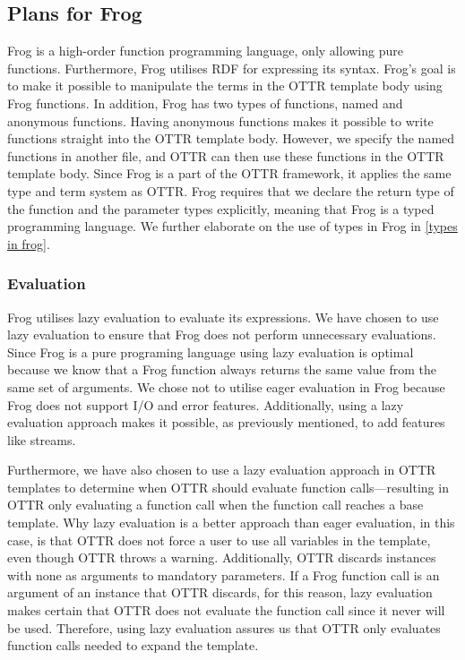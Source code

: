 \subsection{Plans for Frog}
Frog is a high-order function programming language, only allowing pure functions. Furthermore, Frog utilises RDF for expressing its syntax. Frog's goal is to make it possible to manipulate the terms in the OTTR template body using Frog functions. In addition, Frog has two types of functions, named and anonymous functions. Having anonymous functions makes it possible to write functions straight into the OTTR template body. However, we specify the named functions in another file, and OTTR can then use these functions in the OTTR template body. Since Frog is a part of the OTTR framework, it applies the same type and term system as OTTR. Frog requires that we declare the return type of the function and the parameter types explicitly, meaning that Frog is a typed programming language. We further elaborate on the use of types in Frog in \autoref{types in frog}.


\subsubsection{Evaluation}
\label{frog_evaluation}
Frog utilises lazy evaluation to evaluate its expressions. We have chosen to use lazy evaluation to ensure that Frog does not perform unnecessary evaluations. Since Frog is a pure programing language using lazy evaluation is optimal because we know that a Frog function always returns the same value from the same set of arguments. We chose not to utilise eager evaluation in Frog because Frog does not support I/O and error features. Additionally, using a lazy evaluation approach makes it possible, as previously mentioned, to add features like streams.

\para
Furthermore, we have also chosen to use a lazy evaluation approach in OTTR templates to determine when OTTR should evaluate function calls—resulting in OTTR only evaluating a function call when the function call reaches a base template. Why lazy evaluation is a better approach than eager evaluation, in this case, is that OTTR does not force a user to use all variables in the template, even though OTTR throws a warning. Additionally, OTTR discards instances with none as arguments to mandatory parameters. If a Frog function call is an argument of an instance that OTTR discards, for this reason, lazy evaluation makes certain that OTTR does not evaluate the function call since it never will be used. Therefore, using lazy evaluation assures us that OTTR only evaluates function calls needed to expand the template.  

